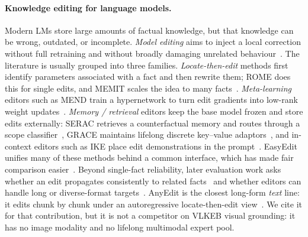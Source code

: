 \documentclass[letterpaper]{article} %
\begin{document}
\paragraph{Knowledge editing for language models.}
Modern LMs store large amounts of factual knowledge, but that knowledge can be wrong, outdated, or incomplete.
\emph{Model editing} aims to inject a local correction without full retraining and without broadly damaging unrelated behaviour~\citep{decao2021knowledgeeditor,yao2023editing}.
The literature is usually grouped into three families.
\emph{Locate-then-edit} methods first identify parameters associated with a fact and then rewrite them; ROME does this for single edits, and MEMIT scales the idea to many facts~\citep{meng2022rome,meng2023memit}.
\emph{Meta-learning} editors such as MEND train a hypernetwork to turn edit gradients into low-rank weight updates~\citep{mitchell2022mend}.
\emph{Memory / retrieval} editors keep the base model frozen and store edits externally: SERAC retrieves a counterfactual memory and routes through a scope classifier~\citep{mitchell2022serac}, GRACE maintains lifelong discrete key--value adaptors~\citep{hartvigsen2023grace}, and in-context editors such as IKE place edit demonstrations in the prompt~\citep{zheng2023ike}.
EasyEdit unifies many of these methods behind a common interface, which has made fair comparison easier~\citep{wang2024easyedit}.
Beyond single-fact reliability, later evaluation work asks whether an edit propagates consistently to related facts~\citep{cohen2024evaluating} and whether editors can handle long or diverse-format targets~\citep{jiang2025anyedit}.
AnyEdit is the closest long-form \emph{text} line: it edits chunk by chunk under an autoregressive locate-then-edit view~\citep{jiang2025anyedit}.
We cite it for that contribution, but it is not a competitor on VLKEB visual grounding: it has no image modality and no lifelong multimodal expert pool.
\end{document}

